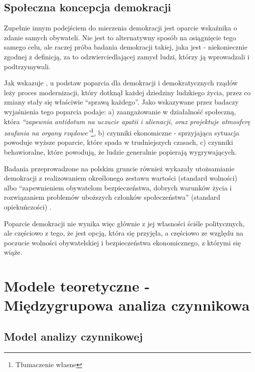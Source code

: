 \documentclass[12pt]{article}
\begin{document}
\hypertarget{spoux142eczna-koncepcja-demokracji}{%
\subsection{Społeczna koncepcja demokracji}\label{spoux142eczna-koncepcja-demokracji}}

Zupełnie innym podejściem do mierzenia demokracji jest oparcie wskaźnika o zdanie samych obywateli. Nie jest to alternatywny sposób na osiągnięcie tego samego celu, ale raczej próba badania demokracji takiej, jaka jest - niekoniecznie zgodnej z definicją, za to odzwierciedlającej zamysł ludzi, którzy ją wprowadzali i podtrzymywali.

Jak wskazuje \citet{Campbell}, u podstaw poparcia dla demokracji i demokratycznych rządów leży proces modernizacji, który dotknął każdej dziedziny ludzkiego życia, przez co zmiany stały się właściwie ``sprawą każdego''. Jako wskazywane przez badaczy wyjaśnienia tego poparcia podaje: a) zaangażowanie w działalność społeczną, która \emph{``zapewnia antidotum na uczucie apatii i alienacji, oraz projektuje atmosferę zaufania na organy rządowe''}\footnote{Tłumaczenie własne}, b) czynniki ekonomiczne - sprzyjająca sytuacja powoduje wyższe poparcie, które spada w trudniejszych czasach, c) czynniki behawioralne, które powodują, że ludzie generalnie popierają wygrywających.

Badania przeprowadzone na polskim gruncie również wykazały utożsamianie demokracji z realizowaniem określonego zestawu wartości (standard wolności) albo ``zapewnieniem obywatelom bezpieczeństwa, dobrych warunków życia i rozwiązaniem problemów uboższych członków społeczeństwa'' (standard opiekuńczości) \citep{JaskoKoss}.

Poparcie demokracji nie wynika więc głównie z jej własności ściśle politycznych, ale częściowo z tego, że jest opcją, która się przyjęła, a częściowo ze względu na poczucie wolności obywatelskiej i bezpieczeństwa ekonomicznego, z którymi się wiąże.

\hypertarget{modele-teoretyczne---miux119dzygrupowa-analiza-czynnikowa}{%
\section{Modele teoretyczne - Międzygrupowa analiza czynnikowa}\label{modele-teoretyczne---miux119dzygrupowa-analiza-czynnikowa}}

\hypertarget{model-analizy-czynnikowej}{%
\subsection{Model analizy czynnikowej}\label{model-analizy-czynnikowej}}
\end{document}
